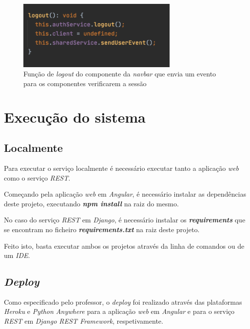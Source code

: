 \documentclass[10pt,english]{article}
\begin{document}
\begin{figure}[!h]
        \centering
        \includegraphics[width=300]{images/logout.png}
        \caption{Função de \textit{logout} do componente da \textit{navbar} que envia um evento para os componentes verificarem a sessão}
\end{figure}


\section{Execução do sistema}

\subsection{Localmente}

\par Para executar o serviço localmente é necessário executar tanto a aplicação \textit{web} como o serviço \textit{REST}.

\par Começando pela aplicação \textit{web} em \textit{Angular}, é necessário instalar as dependências deste projeto, executando \textit{\textbf{npm install}} na raiz do mesmo.

\par No caso do serviço \textit{REST} em \textit{Django}, é necessário instalar os \textit{\textbf{requirements}} que se encontram no ficheiro \textit{\textbf{requirements.txt}} na raiz deste projeto.

\par Feito isto, basta executar ambos os projetos através da linha de comandos ou de um \textit{IDE}.


\subsection{\textit{Deploy}}

\par Como especificado pelo professor, o \textit{deploy} foi realizado através das plataformas \textit{Heroku} e \textit{Python Anywhere} para a aplicação \textit{web} em \textit{Angular} e para o serviço \textit{REST} em \textit{Django REST Framework}, respetivamente.
\end{document}
